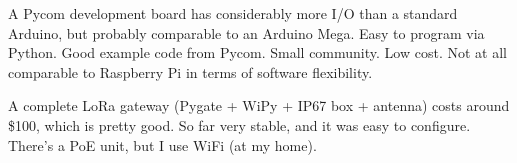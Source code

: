 		A Pycom development board has considerably more I/O than a standard Arduino, but probably comparable to an Arduino Mega. Easy to program via Python. Good example code from Pycom. Small community. Low cost. Not at all comparable to Raspberry Pi in terms of software flexibility.
		
		A complete LoRa gateway (Pygate + WiPy + IP67 box + antenna) costs around \$100, which is pretty good. So far very stable, and it was easy to configure. There's a PoE unit, but I use WiFi (at my home).
		
